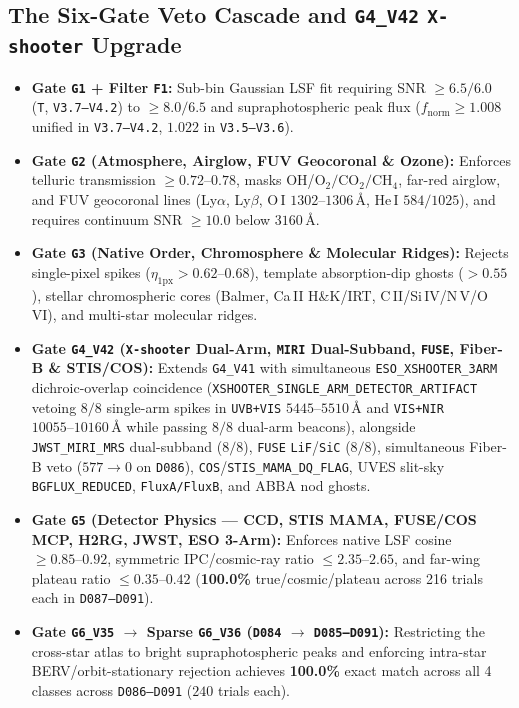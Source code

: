 \documentclass[twocolumn,10pt]{article}
\begin{document}
\subsection{The Six-Gate Veto Cascade and \texttt{G4\_V42} \texttt{X-shooter} Upgrade}
\begin{itemize}
  \item \textbf{Gate \texttt{G1} + Filter \texttt{F1}:} Sub-bin Gaussian LSF fit requiring SNR $\ge 6.5/6.0$ (\texttt{T}, \texttt{V3.7--V4.2}) to $\ge 8.0/6.5$ and supraphotospheric peak flux ($f_{\mathrm{norm}} \ge 1.008$ unified in \texttt{V3.7--V4.2}, $1.022$ in \texttt{V3.5--V3.6}).
  \item \textbf{Gate \texttt{G2} (Atmosphere, Airglow, FUV Geocoronal \& Ozone):} Enforces telluric transmission $\ge 0.72\text{--}0.78$, masks OH/$\mathrm{O_2}/\mathrm{CO_2}/\mathrm{CH_4}$, far-red airglow, and FUV geocoronal lines (Ly$\alpha$, Ly$\beta$, O\,I $1302\text{--}1306\,\text{\AA}$, He\,I $584/1025$), and requires continuum SNR $\ge 10.0$ below $3160\,\text{\AA}$.
  \item \textbf{Gate \texttt{G3} (Native Order, Chromosphere \& Molecular Ridges):} Rejects single-pixel spikes ($\eta_{1\mathrm{px}} > 0.62\text{--}0.68$), template absorption-dip ghosts ($>0.55$), stellar chromospheric cores (Balmer, Ca\,II H\&K/IRT, C\,II/Si\,IV/N\,V/O\,VI), and multi-star molecular ridges.
  \item \textbf{Gate \texttt{G4\_V42} (\texttt{X-shooter} Dual-Arm, \texttt{MIRI} Dual-Subband, \texttt{FUSE}, Fiber-B \& STIS/COS):} Extends \texttt{G4\_V41} with simultaneous \texttt{ESO\_XSHOOTER\_3ARM} dichroic-overlap coincidence (\texttt{XSHOOTER\_SINGLE\_ARM\_DETECTOR\_ARTIFACT} vetoing $8/8$ single-arm spikes in \texttt{UVB+VIS} $5445\text{--}5510\,\text{\AA}$ and \texttt{VIS+NIR} $10055\text{--}10160\,\text{\AA}$ while passing $8/8$ dual-arm beacons), alongside \texttt{JWST\_MIRI\_MRS} dual-subband ($8/8$), \texttt{FUSE} \texttt{LiF}/\texttt{SiC} ($8/8$), simultaneous Fiber-B veto ($577 \rightarrow 0$ on \texttt{D086}), \texttt{COS}/\texttt{STIS\_MAMA\_DQ\_FLAG}, UVES slit-sky \texttt{BGFLUX\_REDUCED}, \texttt{FluxA/FluxB}, and ABBA nod ghosts.
  \item \textbf{Gate \texttt{G5} (Detector Physics --- CCD, STIS MAMA, FUSE/COS MCP, H2RG, JWST, ESO 3-Arm):} Enforces native LSF cosine $\ge 0.85\text{--}0.92$, symmetric IPC/cosmic-ray ratio $\le 2.35\text{--}2.65$, and far-wing plateau ratio $\le 0.35\text{--}0.42$ (\textbf{100.0\%} true/cosmic/plateau across 216 trials each in \texttt{D087--D091}).
  \item \textbf{Gate \texttt{G6\_V35} $\rightarrow$ Sparse \texttt{G6\_V36} (\texttt{D084} $\rightarrow$ \texttt{D085--D091}):} Restricting the cross-star atlas to bright supraphotospheric peaks and enforcing intra-star BERV/orbit-stationary rejection achieves \textbf{100.0\%} exact match across all 4 classes across \texttt{D086--D091} ($240$ trials each).
\end{itemize}
\end{document}
